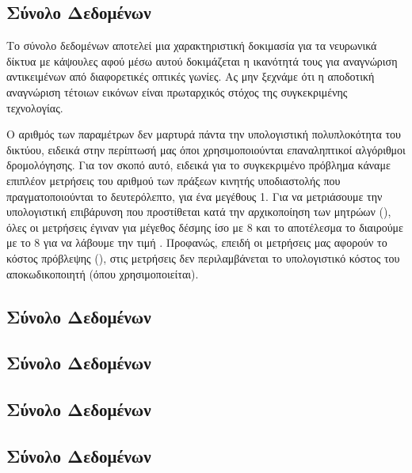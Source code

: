 \subsection{Σύνολο Δεδομένων }
Το σύνολο δεδομένων  αποτελεί μια χαρακτηριστική δοκιμασία για τα νευρωνικά δίκτυα με κάψουλες αφού μέσω αυτού δοκιμάζεται η ικανότητά τους για αναγνώριση αντικειμένων από διαφορετικές οπτικές γωνίες. Ας μην ξεχνάμε ότι η αποδοτική αναγνώριση τέτοιων εικόνων είναι πρωταρχικός στόχος της συγκεκριμένης τεχνολογίας.\par

Ο αριθμός των παραμέτρων δεν μαρτυρά πάντα την υπολογιστική πολυπλοκότητα του δικτύου, ειδεικά στην περίπτωσή μας όποι χρησιμοποιούνται επαναληπτικοί αλγόριθμοι δρομολόγησης. Για τον σκοπό αυτό, ειδεικά για το συγκεκριμένο πρόβλημα κάναμε επιπλέον μετρήσεις του αριθμού των πράξεων κινητής υποδιαστολής που πραγματοποιούνται το δευτερόλεπτο, για ένα  μεγέθους 1. Για να μετριάσουμε την υπολογιστική επιβάρυνση που προστίθεται κατά την αρχικοποίηση των μητρώων (), όλες οι μετρήσεις έγιναν για μέγεθος δέσμης ίσο με 8 και το αποτέλεσμα το διαιρούμε με το 8 για να λάβουμε την τιμή . Προφανώς, επειδή οι μετρήσεις μας αφορούν το κόστος πρόβλεψης (), στις μετρήσεις δεν περιλαμβάνεται το υπολογιστικό κόστος του αποκωδικοποιητή (όπου χρησιμοποιείται).


\subsection{Σύνολο Δεδομένων }
\subsection{Σύνολο Δεδομένων }
\subsection{Σύνολο Δεδομένων }
\subsection{Σύνολο Δεδομένων }




